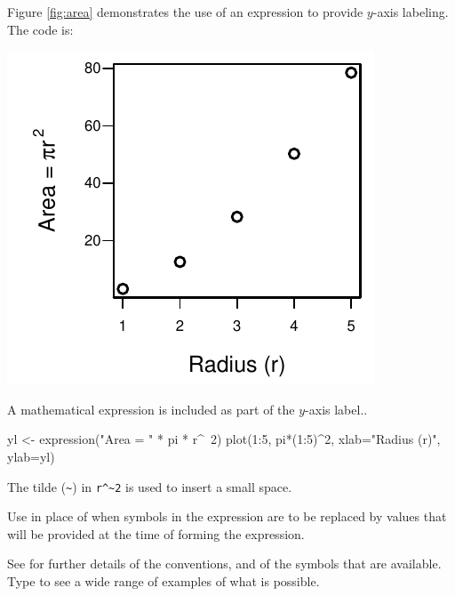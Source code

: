 Figure \ref{fig:area} demonstrates the use of an expression to
provide $y$-axis labeling.  The code is:
\begin{marginfigure}
\begin{Schunk}


\centerline{\includegraphics[width=\textwidth]{figs/09-plot-expr-1} }

\end{Schunk}
\caption{A mathematical expression is included as part of the
  $y$-axis label.\label{fig:area}.}
\end{marginfigure}
\begin{Schunk}
\begin{Sinput}
yl <- expression("Area = " * pi * r^~2)
plot(1:5, pi*(1:5)^2, xlab="Radius (r)", ylab=yl)
\end{Sinput}
\end{Schunk}
\noindent The tilde (\verb+~+) in \verb+r^~2+ is used to insert a small space.

Use  in place of  when
symbols in the expression are to be replaced by values that
will be provided at the time of forming the expression.

See  for further details of the conventions,
and of the symbols that are available.  Type 
to see a wide range of examples of what is possible.

